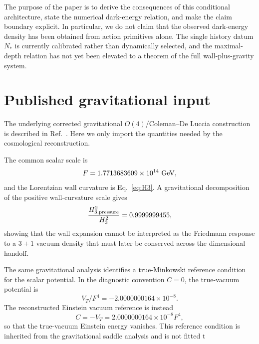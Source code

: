 \documentclass[11pt]{article}
\newcommand{\Nstar}{N_*}
\begin{document}
The purpose of the paper is to derive the consequences of this conditional architecture, state the numerical dark-energy relation, and make the claim boundary explicit.  In particular, we do not claim that the observed dark-energy density has been obtained from action primitives alone.  The single history datum $\Nstar$ is currently calibrated rather than dynamically selected, and the maximal-depth relation has not yet been elevated to a theorem of the full wall-plus-gravity system.

\section{Published gravitational input}

The underlying corrected gravitational $O(4)$/Coleman--De Luccia construction is described in Ref.~\cite{HoffmannGCDL}.  Here we only import the quantities needed by the cosmological reconstruction.

The common scalar scale is
\begin{equation}
F=1.7713683609\times10^{14}\ {\rm GeV},
\end{equation}
and the Lorentzian wall curvature is Eq.~\eqref{eq:H3}.  A gravitational decomposition of the positive wall-curvature scale gives
\begin{equation}
\frac{H_{3,\rm pressure}^2}{H_3^2}=0.9999999455,
\label{eq:pressure_fraction}
\end{equation}
showing that the wall expansion cannot be interpreted as the Friedmann response to a $3+1$ vacuum density that must later be conserved across the dimensional handoff.

The same gravitational analysis identifies a true-Minkowski reference condition for the scalar potential.  In the diagnostic convention $C=0$, the true-vacuum potential is
\begin{equation}
V_T/F^4=-2.0000000164\times10^{-8}.
\end{equation}
The reconstructed Einstein vacuum reference is instead
\begin{equation}
C=-V_T=2.0000000164\times10^{-8}F^4,
\label{eq:trueMinkowski}
\end{equation}
so that the true-vacuum Einstein energy vanishes.  This reference condition is inherited from the gravitational saddle analysis and is not fitted t
\end{document}
